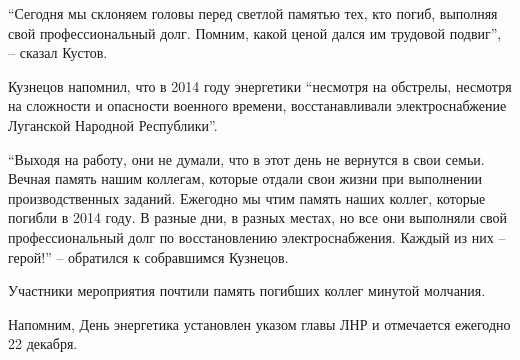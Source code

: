 \enquote{Сегодня мы склоняем головы перед светлой памятью тех, кто погиб, выполняя свой
профессиональный долг. Помним, какой ценой дался им трудовой подвиг}, – сказал
Кустов.

Кузнецов напомнил, что в 2014 году энергетики \enquote{несмотря на обстрелы, несмотря
на сложности и опасности военного времени, восстанавливали электроснабжение
Луганской Народной Республики}.

\enquote{Выходя на работу, они не думали, что в этот день не вернутся в свои семьи.
Вечная память нашим коллегам, которые отдали свои жизни при выполнении
производственных заданий. Ежегодно мы чтим память наших коллег, которые погибли
в 2014 году. В разные дни, в разных местах, но все они выполняли свой
профессиональный долг по восстановлению электроснабжения. Каждый из них –
герой!} – обратился к собравшимся Кузнецов.

Участники мероприятия почтили память погибших коллег минутой молчания.

Напомним, День энергетика установлен указом главы ЛНР и отмечается ежегодно 22
декабря.
